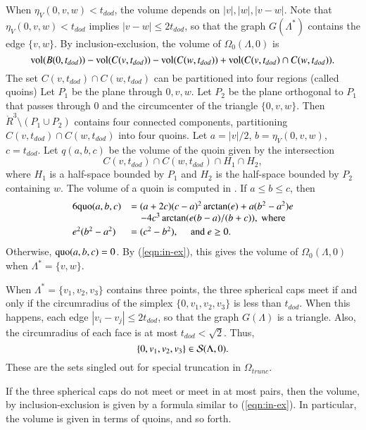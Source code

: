 \documentclass{article} %
\begin{document}
When $\eta_V(0,v,w) < t_{dod}$, the volume depends on
$|v|,|w|,|v-w|$.  Note that $\eta_V(0,v,w) < t_{dod}$ implies
$|v-w|\le 2t_{dod}$, so that the graph $G(\Lambda^*)$ contains
the edge $\{v,w\}$.
By inclusion-exclusion, the volume of $\Omega_0(\Lambda,0)$ is
   \begin{equation}\label{eqn:in-ex}
   {\operatorname{vol}}(B(0,t_{dod})) - {\operatorname{vol}}(C(v,t_{dod})) - {\operatorname{vol}}(C(w,t_{dod})) +
 {\operatorname{vol}}(C(v,t_{dod}) \cap C(w,t_{dod})).
   \end{equation}
The set $C(v,t_{dod})\cap C(w,t_{dod})$ can be partitioned
into four regions (called quoins)
Let $P_1$ be the plane through $0,v,w$.  Let $P_2$ be the
plane orthogonal to $P_1$ that passes through $0$ and the circumcenter
of the triangle $\{0,v,w\}$.  Then $\ring{R}^3\setminus (P_1\cup P_2)$ 
contains four connected components, partitioning $C(v,t_{dod})\cap C(w,t_{dod})$
into four quoins.  
Let $a=|v|/2$, $b=\eta_V(0,v,w)$, $c=t_{dod}$.  Let $q(a,b,c)$ be the
volume of the quoin given by the intersection
  $$C(v,t_{dod})\cap C(w,t_{dod}) \cap H_1 \cap H_2,
  $$
where $H_1$ is a half-space bounded by $P_1$ and $H_2$ is
the half-space bounded by $P_2$ containing $w$.
The volume of a quoin is computed in \cite[7.3]{DCG}.
If $a\le b\le c$, then 
\begin{equation}
\begin{array}{lll}
6 {\operatorname{quo}}(a,b,c) &= (a+2c) (c-a)^2 \arctan(e) + a(b^2-a^2) e \\
&\quad - 4c^3 \arctan(e(b-a)/(b+c)),\text{ where}\\ [0.5ex]
e^2 (b^2-a^2)&= (c^2 - b^2), \quad \text{ and } e\ge 0.
\end{array}
\end{equation}
Otherwise, ${\operatorname{quo}}(a,b,c) = 0$.  By (\ref{eqn:in-ex}), this gives
the volume of $\Omega_0(\Lambda,0)$ when $\Lambda^*=\{v,w\}$.





When $\Lambda^*=\{v_1,v_2,v_3\}$ contains three points, the three spherical
caps meet if and only if the circumradius of the simplex
$\{0,v_1,v_2,v_3\}$ is less than $t_{dod}$.  When this happens, each
edge $|v_i-v_j|\le 2t_{dod}$, so that the graph $G(\Lambda)$ is a
triangle.  Also, the circumradius of each face is at most
$t_{dod} < \sqrt2$.  Thus, 
  $$\{0,v_1,v_2,v_3\}\in{\mathcal S}(\Lambda,0).$$
These are the sets singled out for special truncation in $\Omega_{trunc}$.

If the three spherical caps do not meet or meet in at most pairs,
then the volume, by inclusion-exclusion is given by a formula
similar to (\ref{eqn:in-ex}).  In particular, the volume
is given in terms of quoins, and so forth.
\end{document}
